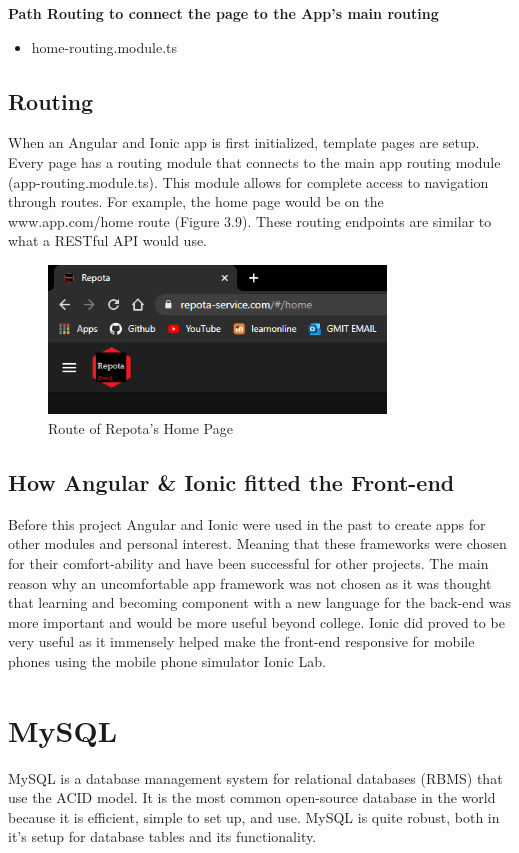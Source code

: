 \textbf{Path Routing to connect the page to the App's main routing}
\begin{itemize}
    \item home-routing.module.ts
\end{itemize} 

\subsection{Routing}
When an Angular and Ionic app is first initialized, template pages are setup. Every page has a routing module that connects to the main app routing module (app-routing.module.ts). This module allows for complete access to navigation through routes. For example, the home page would be on the www.app.com/home route (Figure 3.9). These routing endpoints are similar to what a RESTful API would use.

\begin{figure}[H]
    \caption{Route of Repota's Home Page}
    \label{image:homeRoute}
    \centering
    \includegraphics[width=0.8\textwidth]{images/misc/home-route.png}
\end{figure}

\subsection{How Angular \& Ionic fitted the Front-end}
Before this project Angular and Ionic were used in the past to create apps for other modules and personal interest. Meaning that these frameworks were chosen for their comfort-ability and have been successful for other projects. The main reason why an uncomfortable app framework was not chosen as it was thought that learning and becoming component with a new language for the back-end was more important and would be more useful beyond college. Ionic did proved to be very useful as it immensely helped make the front-end responsive for mobile phones using the mobile phone simulator Ionic Lab. 

\section{MySQL}
MySQL is a database management system for relational databases (RBMS) that use the ACID model. It is the most common open-source database in the world because it is efficient, simple to set up, and use. \cite{ref10} MySQL is quite robust, both in it's setup for database tables and its functionality.
 
